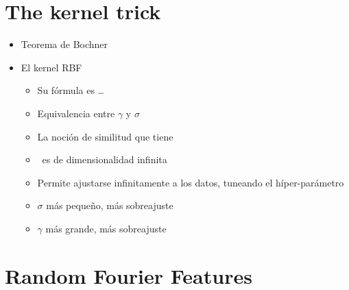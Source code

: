 \section{The kernel trick}
\begin{note}
  \begin{itemize}
    \item Teorema de Bochner
    \item El kernel RBF
    \begin{itemize}
      \item Su fórmula es \ldots
      \item Equivalencia entre $\gamma$ y $\sigma$
      \item La noción de similitud que tiene
      \item \Hspace\ es de dimensionalidad infinita
      \item Permite ajustarse infinitamente a los datos, tuneando el
      híper-parámetro
      \item $\sigma$ más pequeño, más sobreajuste
      \item $\gamma$ más grande, más sobreajuste
    \end{itemize}
  \end{itemize}
\end{note}

\section{Random Fourier Features}
\section{\Nys}
